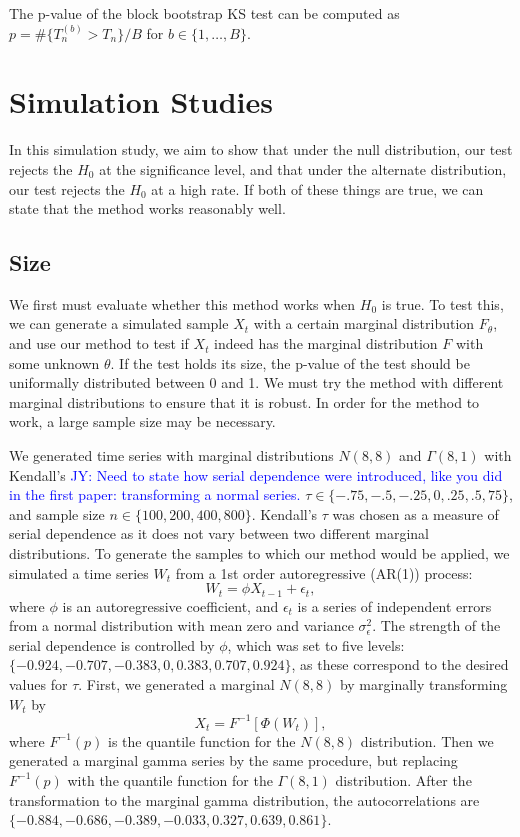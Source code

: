 \documentclass[12pt, titlepage, letterpaper]{article}
\newcommand{\jy}[1]{\textcolor{blue}{JY: #1}}
\begin{document}
{The p-value of the block bootstrap KS test can be computed
as $p = \#\{T^{(b)}_n > T_n\} / B$ for 
$b \in \{1, \ldots, B\}$.

\section{Simulation Studies}
\label{sec:simu}

In this simulation study, we aim to show that under the null
distribution, our test rejects the $H_0$ at the significance level, 
and that under the alternate distribution, our test rejects the $H_0$ at a high
rate. If
both of these things are true, we can state that the method works
reasonably well.


\subsection{Size}
We first must evaluate whether this method works when $H_0$ is true. To
test this, we can
generate a simulated sample $X_t$ with a certain marginal distribution 
$F_\theta$,
and use our method to test if $X_t$ indeed has the marginal distribution $F$ 
with some unknown $\theta$. If the test holds its size, the 
p-value
of the test should be uniformally distributed between 0 and 1. We must try the
method with different marginal distributions to ensure that it is robust.
In order for the method to work, a large sample size may be necessary. 


We generated time series with marginal distributions $N(8, 8)$ and
$\Gamma(8, 1)$ with Kendall's
\jy{Need to state how serial dependence were introduced, like you did in the
  first paper: transforming a normal series.}
$\tau \in \{-.75, -.5, -.25, 0, .25, .5, 75\}$, and
sample size $n \in \{100, 200, 400, 800\}$. Kendall's $\tau$ was chosen as a
measure of serial dependence as it does not vary between two different 
marginal distributions.
To generate the samples to which our
method would be applied, we simulated a time series $W_t$ from a 1st 
order autoregressive (AR(1)) process:
\begin{equation*}
W_t = \phi X_{t-1} + \epsilon_t,
\end{equation*}
where $\phi$ is an autoregressive coefficient, and $\epsilon_t$ is a series of
independent errors from a normal distribution with mean zero and variance
$\sigma_{\epsilon}^2$. The strength of the serial dependence is controlled by
$\phi$, which was set to five levels: 
$\{-0.924, -0.707, -0.383, 0, 0.383, 0.707, 0.924\}$, as these
correspond to the desired values for $\tau$. First, we generated a
marginal $N(8, 8)$ by marginally transforming $W_t$ by
\begin{equation*}
X_t = F^{-1}[\Phi(W_t)],
\end{equation*}
where $F^{-1}(p)$ is the quantile function for the $N(8, 8)$ 
distribution.
Then we generated a marginal gamma series by the same procedure, but
replacing $F^{-1}(p)$ with the quantile function for the $\Gamma(8, 1)$
distribution.
After the transformation
to the marginal gamma distribution, the autocorrelations are $\{-0.884, 
-0.686, -0.389, -0.033, 0.327, 0.639, 0.861\}$.


}
\end{document}
